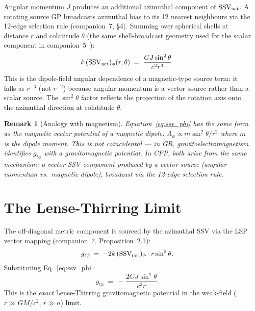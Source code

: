 \documentclass[12pt]{article}
\newtheorem{remark}[theorem]{Remark}
\newcommand{\SSV}{\mathrm{SSV}}
\begin{document}
Angular momentum $J$ produces an additional azimuthal component of
$\SSV_{\rm net}$.  A rotating source GP broadcasts azimuthal bias to
its 12 nearest neighbours via the 12-edge selection rule (companion~7,
§4).  Summing over spherical shells at distance $r$ and colatitude
$\theta$ (the same shell-broadcast geometry used for the scalar
component in companion~5~\cite{c5}):
\begin{equation}
  k\,(\SSV_{\rm net})_\phi(r,\theta) \;=\;
  \frac{GJ\sin^2\theta}{c^2 r^3}.
  \label{eq:ssv_phi}
\end{equation}
This is the dipole-field angular dependence of a magnetic-type source
term: it falls as $r^{-3}$ (not $r^{-2}$) because angular momentum
is a vector source rather than a scalar source.  The $\sin^2\theta$
factor reflects the projection of the rotation axis onto the azimuthal
direction at colatitude $\theta$.

\begin{remark}[Analogy with magnetism]
Equation~\eqref{eq:ssv_phi} has the same form as the magnetic vector
potential of a magnetic dipole: $A_\phi \propto m\sin^2\theta/r^2$
where $m$ is the dipole moment.  This is not coincidental — in GR,
gravitoelectromagnetism identifies $g_{t\phi}$ with a gravitomagnetic
potential.  In CPP, both arise from the same mechanism: a vector SSV
component produced by a vector source (angular momentum vs.\ magnetic
dipole), broadcast via the 12-edge selection rule.
\end{remark}

\section{The Lense-Thirring Limit}
\label{sec:lense_thirring}

The off-diagonal metric component is sourced by the azimuthal SSV via
the LSP vector mapping (companion~7, Proposition~2.1):
\begin{equation}
  g_{t\phi} \;=\; -2k\,(\SSV_{\rm net})_\phi\cdot r\sin^2\theta.
  \label{eq:gtphi_def}
\end{equation}
Substituting Eq.~\eqref{eq:ssv_phi}:
\begin{equation}
  \boxed{g_{t\phi}
  \;=\; -\frac{2GJ\sin^2\theta}{c^2 r}.}
  \label{eq:lense_thirring}
\end{equation}
This is the \emph{exact} Lense-Thirring gravitomagnetic potential in
the weak-field ($r \gg GM/c^2$, $r \gg a$) limit.
\end{document}
